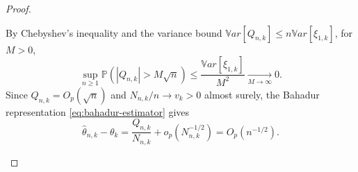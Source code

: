 \begin{proof}
\begin{enumerate}[label=(\roman*)]
		By Chebyshev's inequality and the variance bound \(\mathbb{V}ar[Q_{n,k}]\leq n\mathbb{V}ar[\xi_{1,k}]\), for \(M>0\),
		\[
		\sup_{n\geq1}\mathbb{P}\!\left(|Q_{n,k}|>M\sqrt n\right)
		\leq \frac{\mathbb{V}ar[\xi_{1,k}]}{M^2}
		\xrightarrow[M\to\infty]{}0.
		\]
		Since \(Q_{n,k}=O_p(\sqrt n)\) and \(N_{n,k}/n\to v_k>0\) almost surely, the Bahadur representation \eqref{eq:bahadur-estimator} gives
		\[
		\hat\theta_{n,k}-\theta_k
		=\frac{Q_{n,k}}{N_{n,k}}+o_p(N_{n,k}^{-1/2})
		=O_p(n^{-1/2}).
		\]
		

\end{enumerate}
\end{proof}
